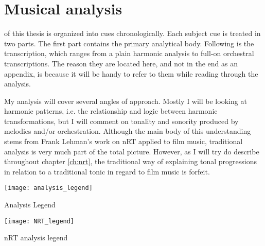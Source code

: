 
\chapter{Musical analysis}\label{ch:musical analysis}

 of this thesis is organized into cues chronologically. Each subject cue is treated in two parts. The first part contains the primary analytical body. Following is the transcription, which ranges from a plain harmonic analysis to full-on orchestral transcriptions. The reason they are located here, and not in the end as an appendix, is because it will be handy to refer to them while reading through the analysis.

My analysis will cover several angles of approach. Mostly I will be looking at harmonic patterns, i.e. the relationship and logic between harmonic transformations, but I will comment on tonality and sonority produced by melodies and/or orchestration. Although the main body of this understanding stems from Frank Lehman's work on \acf{nRT} applied to film music, traditional analysis is very much part of the total picture. However, as I will try do describe throughout chapter \ref{ch:nrt}, the traditional way of explaining tonal progressions in relation to a traditional tonic in regard to film music is forfeit.

\begin{marginfigure}[-6cm]
\texttt{[image: analysis\_legend]}
	\caption{Analysis Legend}
	\label{fg:analysis legend}
\end{marginfigure}

\begin{marginfigure}
\texttt{[image: NRT\_legend]}
	\caption{nRT analysis legend}
	\label{fb:nrt legend}
\end{marginfigure}


